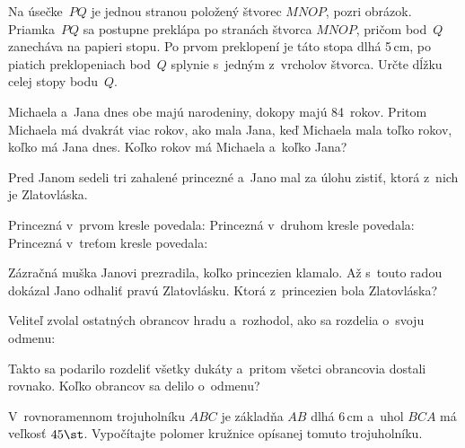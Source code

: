 {%
Na úsečke~$PQ$ je jednou stranou položený štvorec $MNOP$, pozri obrázok.
Priamka~$PQ$ sa postupne preklápa po stranách štvorca $MNOP$, pričom bod~$Q$ zanecháva na papieri stopu.
Po prvom preklopení je táto stopa dlhá 5\,cm, po piatich preklopeniach bod~$Q$ splynie s~jedným z~vrcholov štvorca.
Určte dĺžku celej stopy bodu~$Q$.
{}%
}

{%
Michaela a~Jana dnes obe majú narodeniny, dokopy majú 84~rokov.
Pritom Michaela má dvakrát viac rokov, ako mala Jana, keď Michaela mala toľko rokov, koľko má Jana dnes.
Koľko rokov má Michaela a~koľko Jana?}

{%
Pred Janom sedeli tri zahalené princezné a~Jano mal za úlohu zistiť, ktorá z~nich je Zlatovláska.
\begin{itemize}
\itemvar{} Princezná v~prvom kresle povedala: 
\itemvar{} Princezná v~druhom kresle povedala: 
\itemvar{} Princezná v~treťom kresle povedala: 
\end{itemize}
Zázračná muška Janovi prezradila, koľko princezien klamalo. Až s~touto radou dokázal Jano odhaliť pravú Zlatovlásku.
Ktorá z~princezien bola Zlatovláska?
}

{%
Veliteľ zvolal ostatných obrancov hradu a~rozhodol, ako sa rozdelia o~svoju odmenu:


Takto sa podarilo rozdeliť všetky dukáty a~pritom všetci obrancovia dostali rovnako.
Koľko obrancov sa delilo o~odmenu?}

{%
V~rovnoramennom trojuholníku $ABC$ je základňa $AB$ dlhá 6\,cm a~uhol $BCA$ má veľkosť $45\st$.
Vypočítajte polomer kružnice opísanej tomuto trojuholníku.}

